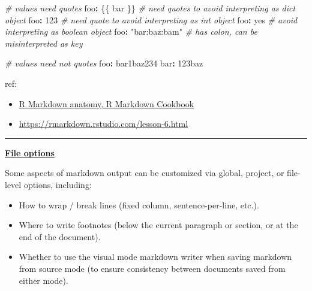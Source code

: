 \documentclass[
  a4paper,
  twoside,
  openright]{book}
\newenvironment{Shaded}{\begin{snugshade}}{\end{snugshade}}
\newcommand{\CommentTok}[1]{\textcolor[rgb]{0.56,0.35,0.01}{\textit{#1}}}
\newcommand{\DecValTok}[1]{\textcolor[rgb]{0.00,0.00,0.81}{#1}}
\newcommand{\NormalTok}[1]{#1}
\newcommand{\SpecialCharTok}[1]{\textcolor[rgb]{0.81,0.36,0.00}{\textbf{#1}}}
\newcommand{\StringTok}[1]{\textcolor[rgb]{0.31,0.60,0.02}{#1}}
\providecommand{\tightlist}{%
  \setlength{\itemsep}{0pt}\setlength{\parskip}{0pt}}
\theoremstyle{definition}
\theoremstyle{definition}
\theoremstyle{definition}
\theoremstyle{definition}
\theoremstyle{remark}
\begin{document}
\begin{Shaded}
\begin{Highlighting}[]
\CommentTok{\# values need quotes}
\NormalTok{foo}\SpecialCharTok{:} \StringTok{\textquotesingle{}\{\{ bar \}\}\textquotesingle{}} \CommentTok{\# need quotes to avoid interpreting as \textasciigrave{}dict\textasciigrave{} object}
\NormalTok{foo}\SpecialCharTok{:} \StringTok{\textquotesingle{}123\textquotesingle{}}       \CommentTok{\# need quote to avoid interpreting as \textasciigrave{}int\textasciigrave{} object}
\NormalTok{foo}\SpecialCharTok{:} \StringTok{\textquotesingle{}yes\textquotesingle{}}           \CommentTok{\# avoid interpreting as \textasciigrave{}boolean\textasciigrave{} object}
\NormalTok{foo}\SpecialCharTok{:} \StringTok{"bar:baz:bam"} \CommentTok{\# has colon, can be misinterpreted as key}

\CommentTok{\# values need not quotes}
\NormalTok{foo}\SpecialCharTok{:}\NormalTok{ bar1baz234}
\NormalTok{bar}\SpecialCharTok{:} \DecValTok{123}\NormalTok{baz}
\end{Highlighting}
\end{Shaded}

ref:

\begin{itemize}
\tightlist
\item
  \href{https://bookdown.org/yihui/rmarkdown-cookbook/rmarkdown-anatomy.html\#:~:text=In\%20short\%2C\%20we\%20can\%20include\%20variables\%20and\%20R\%20expressions\%20in\%20this\%20header\%20that\%20can\%20be\%20referenced\%20throughout\%20our\%20R\%20Markdown\%20document.}{R Markdown anatomy, R Markdown Cookbook}
\item
  \url{https://rmarkdown.rstudio.com/lesson-6.html}
\end{itemize}

\begin{center}\rule{0.5\linewidth}{0.5pt}\end{center}

\href{https://rstudio.github.io/visual-markdown-editing/options.html\#file-options}{\textbf{File options}}

Some aspects of markdown output can be customized via global, project, or file-level options, including:

\begin{itemize}
\tightlist
\item
  How to wrap / break lines (fixed column, sentence-per-line, etc.).
\item
  Where to write footnotes (below the current paragraph or section, or at the end of the document).
\item
  Whether to use the visual mode markdown writer when saving markdown from source mode (to ensure consistency between documents saved from either mode).
\end{itemize}
\end{document}
